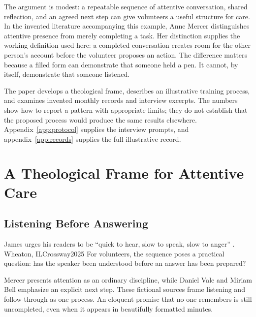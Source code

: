 \documentclass[font=termes]{mbts}
\begin{document}
The argument is modest: a repeatable sequence of attentive conversation,
shared reflection, and an agreed next step can give volunteers a useful
structure for care. In the invented literature accompanying this example,
Anne Mercer distinguishes attentive presence from merely completing a
task.\autocite[24]{mercer-presence} Her distinction supplies the working
definition used here: a completed conversation creates room for the other
person's account before the volunteer proposes an action.\autocite[24]{mercer-presence}
The difference matters because a filled form can demonstrate that someone
held a pen. It cannot, by itself, demonstrate that someone listened.

The paper develops a theological frame, describes an illustrative training
process, and examines invented monthly records and interview excerpts.
The numbers show how to report a pattern with appropriate limits; they do not
establish that the proposed process would produce the same results elsewhere.
Appendix~\ref{app:protocol} supplies the interview prompts, and
appendix~\ref{app:records} supplies the full illustrative record.

\clearpage
\section{A Theological Frame for Attentive Care}
\subsection{Listening Before Answering}
James urges his readers to be ``quick to hear, slow to speak, slow to anger''
.
  {Wheaton, IL}{Crossway}{2025}
For volunteers, the sequence poses a practical
question: has the speaker been understood before an answer has been prepared?

Mercer presents attention as an ordinary discipline, while Daniel Vale and
Miriam Bell emphasize an explicit next step.
\autocites[39--41]{mercer-presence}[62]{vale-bell}
These fictional sources frame listening and follow-through as one process.
An eloquent promise that no one remembers is still uncompleted, even when it
appears in beautifully formatted minutes.
\end{document}
